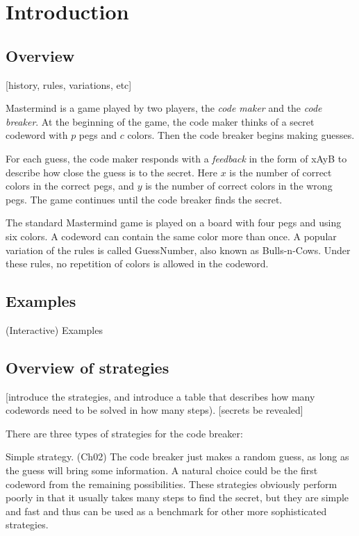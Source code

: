 \chapter{Introduction}

\section{Overview}

[history, rules, variations, etc]

Mastermind is a game played by two players, the \emph{code maker} and the \emph{code breaker}. At the beginning of the game, the code maker thinks of a secret codeword with $p$ pegs and $c$ colors. Then the code breaker begins making guesses.

For each guess, the code maker responds with a \emph{feedback} in the form of xAyB to describe how close the guess is to the secret. Here $x$ is the number of correct colors in the correct pegs, and $y$ is the number of correct colors in the wrong pegs. The game continues until the code breaker finds the secret.

The standard Mastermind game is played on a board with four pegs and using six colors. A codeword can contain the same color more than once. A popular variation of the rules is called GuessNumber, also known as Bulls-n-Cows. Under these rules, no repetition of colors is allowed in the codeword.

\section{Examples}

(Interactive) Examples

\section{Overview of strategies}

[introduce the strategies, and introduce a table that describes how many codewords need to be solved in how many steps). [secrets be revealed]

There are three types of strategies for the code breaker:

Simple strategy. (Ch02) The code breaker just makes a random guess, as long as the guess will bring some information. A natural choice could be the first codeword from the remaining possibilities. These strategies obviously perform poorly in that it usually takes many steps to find the secret, but they are simple and fast and thus can be used as a benchmark for other more sophisticated strategies.

